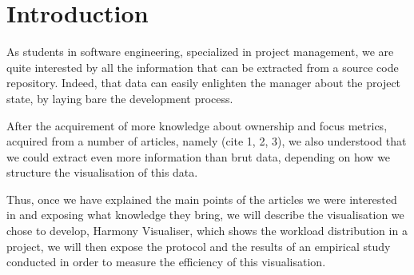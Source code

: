 \section{Introduction}

 As students in software engineering, specialized in project management, we are quite interested by all the information that can be extracted from a source code repository. Indeed, that data can easily enlighten the manager about the project state, by laying bare the development process. 

After the acquirement of more knowledge about ownership and focus metrics, acquired from a number of articles, namely (cite 1, 2, 3), we also understood that we could extract even more information than brut data, depending on how we structure the visualisation of this data.

Thus, once we have explained the main points of the articles we were interested in and exposing what knowledge they bring, we will describe the visualisation we chose to develop, Harmony Visualiser, which shows the workload distribution in a project, we will then expose the protocol and the results of an empirical study conducted in order to measure the efficiency of this visualisation.